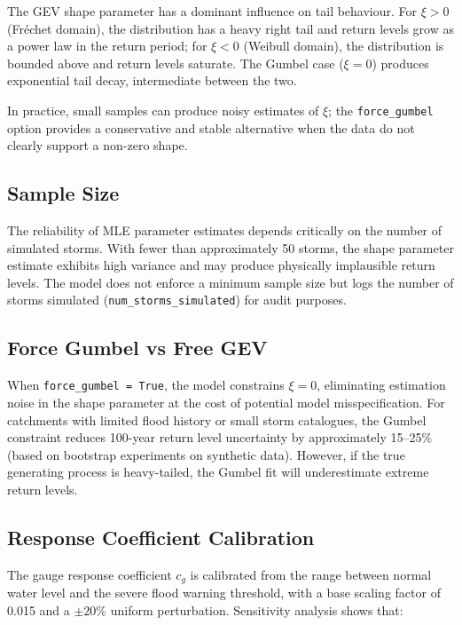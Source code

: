 \documentclass[11pt,a4paper]{article}
\begin{document}
The GEV shape parameter has a dominant influence on tail behaviour. For $\xi > 0$ (Fr\'{e}chet domain), the distribution has a heavy right tail and return levels grow as a power law in the return period; for $\xi < 0$ (Weibull domain), the distribution is bounded above and return levels saturate. The Gumbel case ($\xi = 0$) produces exponential tail decay, intermediate between the two.



\noindent In practice, small samples can produce noisy estimates of $\xi$; the \texttt{force\_gumbel} option provides a conservative and stable alternative when the data do not clearly support a non-zero shape.

\subsection{Sample Size}

The reliability of MLE parameter estimates depends critically on the number of simulated storms. With fewer than approximately 50 storms, the shape parameter estimate exhibits high variance and may produce physically implausible return levels. The model does not enforce a minimum sample size but logs the number of storms simulated (\texttt{num\_storms\_simulated}) for audit purposes.

\subsection{Force Gumbel vs Free GEV}

When \texttt{force\_gumbel = True}, the model constrains $\xi = 0$, eliminating estimation noise in the shape parameter at the cost of potential model misspecification. For catchments with limited flood history or small storm catalogues, the Gumbel constraint reduces 100-year return level uncertainty by approximately 15--25\% (based on bootstrap experiments on synthetic data). However, if the true generating process is heavy-tailed, the Gumbel fit will underestimate extreme return levels.

\subsection{Response Coefficient Calibration}

The gauge response coefficient $c_g$ is calibrated from the range between normal water level and the severe flood warning threshold, with a base scaling factor of 0.015 and a $\pm 20\%$ uniform perturbation. Sensitivity analysis shows that:
\end{document}
